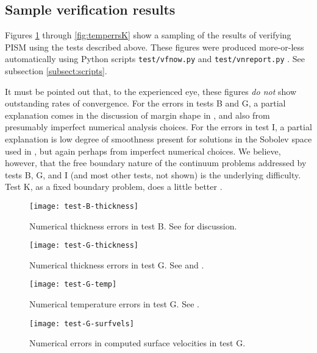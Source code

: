 \subsection{Sample verification results}  Figures \ref{fig:thickerrsB} through
\ref{fig:temperrsK} show a sampling of the results of verifying PISM using the
tests described above.  These
figures were produced more-or-less automatically using Python scripts
\texttt{test/vfnow.py}  and \texttt{test/vnreport.py} .  See subsection \ref{subsect:scripts}.

It must be pointed out that, to the experienced eye, these figures \emph{do not} show outstanding rates of convergence.  For the errors in tests B and G, a partial explanation comes in the discussion of margin shape in \cite{BLKCB}, and also from presumably imperfect numerical analysis choices.  For the errors in test I, a partial explanation is low degree of smoothness present for solutions in the Sobolev space used in \cite{SchoofStream}, but again perhaps from imperfect numerical choices.  We believe, however, that the free boundary nature of the continuum problems addressed by tests B, G, and I (and most other tests, not shown) is the underlying difficulty.  Test K, as a fixed boundary problem, does a little better \cite{BuelerTestK}.

\begin{figure}[ht]
\centering
\texttt{[image: test-B-thickness]}
\caption{Numerical thickness errors in test B. See \cite{BLKCB} for discussion.}
\label{fig:thickerrsB}
\end{figure}

\begin{figure}[ht]
\centering
\texttt{[image: test-G-thickness]}
\caption{Numerical thickness errors in test G.  See \cite{BBL} and \cite{BLKCB}.}
\label{fig:thickerrsG}
\end{figure}

\begin{figure}[ht]
\centering
\texttt{[image: test-G-temp]}
\caption{Numerical temperature errors in test G. See \cite{BBL}.}
\label{fig:temperrsG}
\end{figure}

\begin{figure}[ht]
\centering
\texttt{[image: test-G-surfvels]}
\caption{Numerical errors in computed surface velocities in test G.}
\label{fig:surfvelerrsG}
\end{figure}

